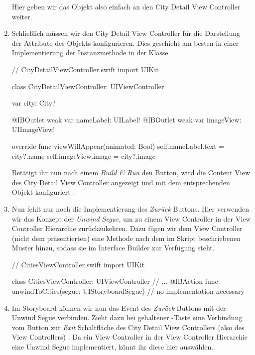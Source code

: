 \documentclass[parskip=half, final]{scrreprt}
\begin{document}
\begin{lecture}
\begin{enumerate}
Hier geben wir das  Objekt also einfach an den City Detail View Controller weiter.

\item Schließlich müssen wir den City Detail View Controller für die Darstellung der Attribute des  Objekts konfigurieren. Dies geschieht am besten in einer Implementierung der  Instanzmethode in der  Klasse.

\begin{swiftcode}
// CityDetailViewController.swift
import UIKit

class CityDetailViewController: UIViewController {
    var city: City?

    @IBOutlet weak var nameLabel: UILabel!
    @IBOutlet weak var imageView: UIImageView!
    
    override func viewWillAppear(animated: Bool) {
        self.nameLabel.text = city?.name
        self.imageView.image = city?.image
    }
}
\end{swiftcode}

Betätigt ihr nun nach einem \emph{Build \& Run} den Button, wird die Content View des City Detail View Controller angezeigt und mit dem entsprechenden  Objekt konfiguriert .


\item Nun fehlt nur noch die Implementierung des \emph{Zurück} Buttons. Hier verwenden wir das Konzept der \emph{Unwind Segue}, um zu einem View Controller in der View Controller Hierarchie zurückzukehren. Dazu fügen wir dem  View Controller (nicht dem präsentierten) eine Methode  nach dem im Skript beschriebenen Muster hinzu, sodass sie im Interface Builder zur Verfügung steht.

\begin{swiftcode}
// CitiesViewController.swift
import UIKit

class CitiesViewController: UIViewController {
    // ...
    @IBAction func unwindToCities(segue: UIStoryboardSegue) {
        // no implementation necessary
    }
}
\end{swiftcode}

\item Im Storyboard können wir nun das  Event des \emph{Zurück} Buttons mit der Unwind Segue verbinden. Zieht dazu bei gehaltener \keys{\ctrl}-Taste eine Verbindung vom Button zur \emph{Exit} Schaltfläche des City Detail View Controllers (also des  View Controllers) . Da ein View Controller in der View Controller Hierarchie eine Unwind Segue  implementiert, könnt ihr diese hier auswählen.


\end{enumerate}
\end{lecture}
\end{document}
